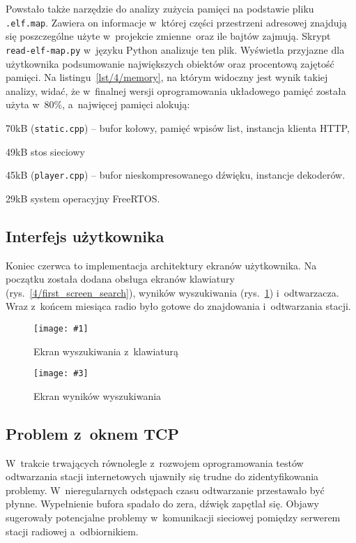 \documentclass[polish]{aghengthesis}
\let\tempone\itemize
\let\temptwo\enditemize
\renewenvironment{itemize}{\tempone\setlength{\itemsep}{0cm}}{\temptwo}
\newcommand{\imgintss}[5]{
	\begin{figure}[{#5}]
		\centering
		\begin{minipage}{.45\textwidth}
			\centering
			\texttt{[image: \#1]}
			\caption{#2}
			\label{#1}
		\end{minipage}%
		\hfill
		\begin{minipage}{.45\textwidth}
			\centering
			\texttt{[image: \#3]}
			\caption{#4}
			\label{#3}
		\end{minipage}
	\end{figure}
}
\newcommand{\imghss}[4]{\imgintss{#1}{#2}{#3}{#4}{H}}
\newcommand{\lstfile}[3]{
	\noindent
	\hspace{0.1\linewidth}
	\begin{minipage}{0.8\linewidth}
		
	\end{minipage}
	\vspace{0.3cm}
}
\begin{document}
				Powstało także narzędzie do analizy zużycia pamięci na podstawie pliku \lstinline|.elf.map|. Zawiera on informacje w~której części przestrzeni adresowej znajdują się poszczególne użyte w~projekcie zmienne oraz ile bajtów zajmują. Skrypt \lstinline|read-elf-map.py| w~języku Python analizuje ten plik. Wyświetla przyjazne dla użytkownika podsumowanie największych obiektów oraz procentową zajętość pamięci. Na listingu~\ref{lst/4/memory}, na którym widoczny jest wynik takiej analizy, widać, że w~finalnej wersji oprogramowania układowego pamięć została	użyta w~80\%, a~najwięcej pamięci alokują:
				\begin{itemize}
					\item 70kB (\lstinline|static.cpp|) -- bufor kołowy, pamięć wpisów list, instancja klienta HTTP,
					\item 49kB stos sieciowy
					\item 45kB (\lstinline|player.cpp|) -- bufor nieskompresowanego dźwięku, instancje dekoderów.
					\item 29kB system operacyjny FreeRTOS.
				\end{itemize}
				
				\lstfile{default}{Zajętość pamięci RAM}{lst/4/memory}
			
		\subsection{Interfejs użytkownika}
			Koniec czerwca to implementacja architektury ekranów użytkownika. Na początku została dodana obsługa ekranów klawiatury (rys.~\ref{4/first_screen_search}), wyników wyszukiwania (rys.~\ref{4/first_screen_res}) i~odtwarzacza. Wraz z~końcem miesiąca radio było gotowe do znajdowania i~odtwarzania stacji.
			
			\imghss{4/first_screen_search}{Ekran wyszukiwania z~klawiaturą}{4/first_screen_res}{Ekran wyników wyszukiwania}
			
		\subsection{Problem z~oknem TCP}
			W~trakcie trwających równolegle z~rozwojem oprogramowania testów odtwarzania stacji internetowych ujawniły się trudne do zidentyfikowania problemy.
			W~nieregularnych odstępach czasu odtwarzanie przestawało być płynne. Wypełnienie bufora spadało do zera, dźwięk zapętlał się. Objawy sugerowały potencjalne problemy w~komunikacji sieciowej pomiędzy serwerem stacji radiowej a~odbiornikiem.
			$ $\\
			
\end{document}
